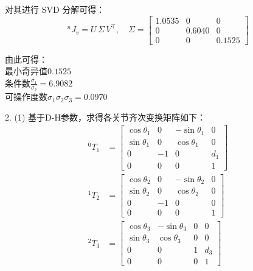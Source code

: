 \documentclass[UTF8, 12pt]{ctexart}
\begin{document}
对其进行 SVD 分解可得：
\[
{}^n J_v = U\, \Sigma\, V^{\top},\quad
\Sigma = \begin{bmatrix}
            1.0535 & 0 & 0 \\
            0 & 0.6040 & 0 \\
            0 & 0 & 0.1525
        \end{bmatrix}
\]

由此可得： \\
最小奇异值\(0.1525\) \\
条件数\(\frac{\sigma_1}{\sigma_3} = 6.9082\) \\
可操作度数\(\sigma_1 \sigma_2 \sigma_3 = 0.0970\)
\newpage



2.
(1)
基于D-H参数，求得各关节齐次变换矩阵如下：
\[
\begin{aligned}
    {}^0 T_1 &= \begin{bmatrix}
                    \cos\theta_1 & 0 & -\sin\theta_1 & 0 \\
                    \sin\theta_1 & 0 & \cos\theta_1 & 0 \\
                    0 & -1 & 0 & d_1 \\
                    0 & 0 & 0 & 1
                \end{bmatrix} \\
    {}^1 T_2 &= \begin{bmatrix}
                    \cos\theta_2 & 0 & -\sin\theta_2 & 0 \\
                    \sin\theta_2 & 0 & \cos\theta_2 & 0 \\
                    0 & -1 & 0 & 0 \\
                    0 & 0 & 0 & 1
                \end{bmatrix} \\
    {}^2 T_3 &= \begin{bmatrix}
                    \cos\theta_3 & -\sin\theta_3 & 0 & 0 \\
                    \sin\theta_3 & \cos\theta_3 & 0 & 0 \\
                    0 & 0 & 1 & d_3 \\
                    0 & 0 & 0 & 1
                \end{bmatrix} \\
\end{aligned}
\]
\end{document}
